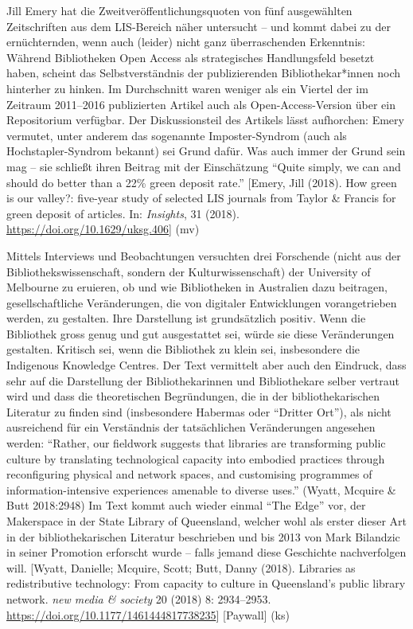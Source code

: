 \documentclass[a4paper,
fontsize=11pt,
oneside,
numbers=noperiodatend,
parskip=half-,
bibliography=totoc,
final
]{scrartcl}
\begin{document}
Jill Emery hat die Zweitveröffentlichungsquoten von fünf ausgewählten
Zeitschriften aus dem LIS-Bereich näher untersucht -- und kommt dabei zu
der ernüchternden, wenn auch (leider) nicht ganz überraschenden
Erkenntnis: Während Bibliotheken Open Access als strategisches
Handlungsfeld besetzt haben, scheint das Selbstverständnis der
publizierenden Bibliothekar*in\-nen noch hinterher zu hinken. Im
Durchschnitt waren weniger als ein Viertel der im Zeitraum 2011--2016
publizierten Artikel auch als Open-Access-Version über ein Repositorium
verfügbar. Der Diskussionsteil des Artikels lässt aufhorchen: Emery
vermutet, unter anderem das sogenannte Imposter-Syndrom (auch als
Hochstapler-Syndrom bekannt) sei Grund dafür. Was auch immer der Grund
sein mag -- sie schließt ihren Beitrag mit der Einschätzung
\enquote{Quite simply, we can and should do better than a 22\% green
deposit rate.} {[}Emery, Jill (2018). How green is our valley?:
five-year study of selected LIS journals from Taylor \& Francis for
green deposit of articles. In: \emph{Insights}, 31 (2018).
\url{https://doi.org/10.1629/uksg.406}{]} (mv)

Mittels Interviews und Beobachtungen versuchten drei Forschende (nicht
aus der Bibliothekswissenschaft, sondern der Kulturwissenschaft) der
University of Melbourne zu eruieren, ob und wie Bibliotheken in
Australien dazu beitragen, gesellschaftliche Veränderungen, die von
digitaler Entwicklungen vorangetrieben werden, zu gestalten. Ihre
Darstellung ist grundsätzlich positiv. Wenn die Bibliothek gross genug
und gut ausgestattet sei, würde sie diese Veränderungen gestalten.
Kritisch sei, wenn die Bibliothek zu klein sei, insbesondere die
Indigenous Knowledge Centres. Der Text vermittelt aber auch den
Eindruck, dass sehr auf die Darstellung der Bibliothekarinnen und
Bibliothekare selber vertraut wird und dass die theoretischen
Begründungen, die in der bibliothekarischen Literatur zu finden sind
(insbesondere Habermas oder \enquote{Dritter Ort}), als nicht
ausreichend für ein Verständnis der tatsächlichen Veränderungen
angesehen werden: \enquote{Rather, our fieldwork suggests that libraries
are transforming public culture by translating technological capacity
into embodied practices through reconfiguring physical and network
spaces, and customising programmes of information-intensive experiences
amenable to diverse uses.} (Wyatt, Mcquire \& Butt 2018:2948) Im Text
kommt auch wieder einmal \enquote{The Edge} vor, der Makerspace in der
State Library of Queensland, welcher wohl als erster dieser Art in der
bibliothekarischen Literatur beschrieben und bis 2013 von Mark Bilandzic
in seiner Promotion erforscht wurde -- falls jemand diese Geschichte
nachverfolgen will. {[}Wyatt, Danielle; Mcquire, Scott; Butt, Danny
(2018). Libraries as redistributive technology: From capacity to culture
in Queensland's public library network. \emph{new media \& society} 20
(2018) 8: 2934--2953. \url{https://doi.org/10.1177/1461444817738235}{]}
{[}Paywall{]} (ks)
\end{document}
